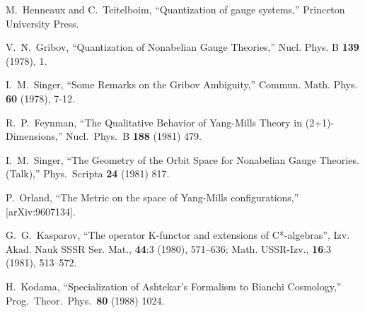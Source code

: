 \documentclass[letterpaper,11pt]{article}
\begin{document}
\begin{thebibliography}{99}
M.~Henneaux and C.~Teitelboim,
``Quantization of gauge systems,''
Princeton University Press.






V.~N.~Gribov,
``Quantization of Nonabelian Gauge Theories,''
Nucl. Phys. B \textbf{139} (1978), 1.



I.~M.~Singer,
``Some Remarks on the Gribov Ambiguity,''
Commun. Math. Phys. \textbf{60} (1978), 7-12.








  R.~P.~Feynman,
  ``The Qualitative Behavior of Yang-Mills Theory in (2+1)-Dimensions,''
  Nucl.\ Phys.\ B {\bf 188} (1981) 479.

 
  I.~M.~Singer,
  ``The Geometry of the Orbit Space for Nonabelian Gauge Theories. (Talk),''
  Phys.\ Scripta {\bf 24} (1981) 817.


  P.~Orland,
  ``The Metric on the space of Yang-Mills configurations,''
  [arXiv:9607134].




G.~G.~Kasparov, 
``The operator K-functor and extensions of C*-algebras'', 
Izv. Akad. Nauk SSSR Ser. Mat., {\bf 44}:3 (1980), 571–636; Math. USSR-Izv., {\bf 16}:3 (1981), 513–572.



  H.~Kodama,
  ``Specialization of Ashtekar's Formalism to Bianchi Cosmology,''
  Prog.\ Theor.\ Phys.\  {\bf 80} (1988) 1024.




\end{thebibliography}
\end{document}
